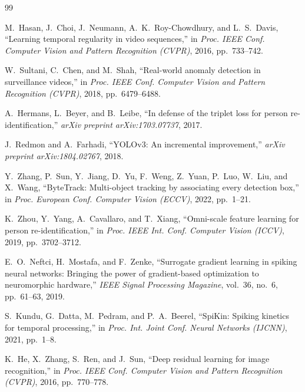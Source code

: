 \documentclass[12pt,a4paper]{report}
\begin{document}
\begin{thebibliography}{99}
\sloppy

M.~Hasan, J.~Choi, J.~Neumann, A.~K.~Roy-Chowdhury, and L.~S.~Davis, ``Learning temporal regularity in video sequences,'' in \textit{Proc. IEEE Conf. Computer Vision and Pattern Recognition (CVPR)}, 2016, pp.~733--742.

W.~Sultani, C.~Chen, and M.~Shah, ``Real-world anomaly detection in surveillance videos,'' in \textit{Proc. IEEE Conf. Computer Vision and Pattern Recognition (CVPR)}, 2018, pp.~6479--6488.

A.~Hermans, L.~Beyer, and B.~Leibe, ``In defense of the triplet loss for person re-identification,'' \textit{arXiv preprint arXiv:1703.07737}, 2017.

J.~Redmon and A.~Farhadi, ``YOLOv3: An incremental improvement,'' \textit{arXiv preprint arXiv:1804.02767}, 2018.

Y.~Zhang, P.~Sun, Y.~Jiang, D.~Yu, F.~Weng, Z.~Yuan, P.~Luo, W.~Liu, and X.~Wang, ``ByteTrack: Multi-object tracking by associating every detection box,'' in \textit{Proc. European Conf. Computer Vision (ECCV)}, 2022, pp.~1--21.

K.~Zhou, Y.~Yang, A.~Cavallaro, and T.~Xiang, ``Omni-scale feature learning for person re-identification,'' in \textit{Proc. IEEE Int. Conf. Computer Vision (ICCV)}, 2019, pp.~3702--3712.

E.~O.~Neftci, H.~Mostafa, and F.~Zenke, ``Surrogate gradient learning in spiking neural networks: Bringing the power of gradient-based optimization to neuromorphic hardware,'' \textit{IEEE Signal Processing Magazine}, vol.~36, no.~6, pp.~61--63, 2019.

S.~Kundu, G.~Datta, M.~Pedram, and P.~A.~Beerel, ``SpiKin: Spiking kinetics for temporal processing,'' in \textit{Proc. Int. Joint Conf. Neural Networks (IJCNN)}, 2021, pp.~1--8.

K.~He, X.~Zhang, S.~Ren, and J.~Sun, ``Deep residual learning for image recognition,'' in \textit{Proc. IEEE Conf. Computer Vision and Pattern Recognition (CVPR)}, 2016, pp.~770--778.


\end{thebibliography}
\end{document}
